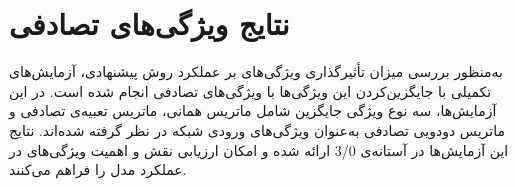 \section{نتایج ویژگی‌های تصادفی}
به‌‌منظور بررسی میزان تأثیرگذاری ویژگی‌های  بر عملکرد روش پیشنهادی، آزمایش‌های تکمیلی با جایگزین‌کردن این ویژگی‌ها با ویژگی‌های تصادفی انجام شده است. در این آزمایش‌ها، سه نوع ویژگی جایگزین شامل ماتریس همانی، ماتریس تعبیه‌ی تصادفی و ماتریس دودویی تصادفی به‌عنوان ویژگی‌های ورودی شبکه در نظر گرفته شده‌اند. نتایج این آزمایش‌ها در آستانه‌ی 3/0 ارائه شده و امکان ارزیابی نقش و اهمیت ویژگی‌های  در عملکرد مدل را فراهم می‌کنند.

\begin{table}[htbp]
	\centering
	\caption{مقایسه عملکرد مدل با ویژگی‌های تصادفی با سه رویکرد ماتریس همانی، ویژگی‌های تعبیه تصادفی و ویژگی‌های دودویی تصادفی بر روی مجموعه‌داده‌های  و }
	\vspace{5mm}
	\label{table:baseline-comparison-metrics}
\end{table}




